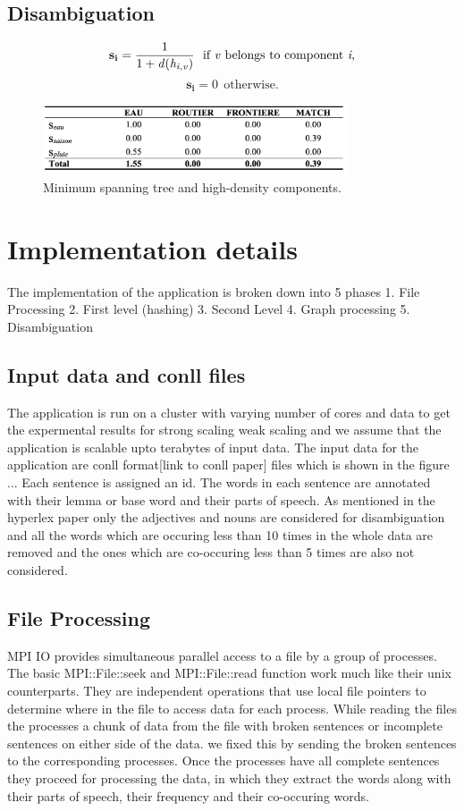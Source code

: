 \documentclass[article,dr=phil,type=drfinal,colorback,accentcolor=tud9c]{tudthesis}
\begin{document}
\subsection{Disambiguation}

\[ \mathbf{s_i} = \frac{1}{1 + \mathit{d}(\mathit{h_{i,v}})} \ \ \textrm{if \textit{v} belongs to component \textit{i},}\] 
\[ \mathbf{s_i} = 0 \ \ \textrm{otherwise.} \]

\begin{figure}[htb]
	\centering
	\includegraphics[width=90mm]{images/wsdscore}
	\caption[Minimum spanning tree and high-density components.]{Minimum spanning tree and high-density components.}
	\label{fig:delineate}
\end{figure}

\newpage
\section{Implementation details}
The implementation of the application is broken down into 5 phases
1. File Processing
2. First level (hashing)
3. Second Level
4. Graph processing
5. Disambiguation
\newpage
\subsection{Input data and conll files}
The application is run on a cluster with varying number of cores and data to get the expermental results for strong scaling weak scaling and we assume that the application is scalable upto terabytes of input data. The input data for the application are conll format[link to conll paper] files which is shown in the figure ... Each sentence is assigned an id. The words in each sentence are annotated with their lemma or base word and their parts of speech.  As mentioned in the hyperlex paper only the adjectives and nouns are considered for disambiguation and all the words which are occuring less than 10 times in the whole data are removed and the ones which are co-occuring less than 5 times are also not considered.

\newpage
\subsection{File Processing}
MPI IO provides simultaneous parallel access to a file by a group of processes.  The basic MPI::File::seek and MPI::File::read function work much like their unix counterparts. They are independent operations that use local file pointers to determine where in the file to access data for each process. While reading the files the processes a chunk of data from the file with broken sentences or incomplete sentences on either side of the data. we fixed this by sending the broken sentences to the corresponding processes. Once the processes have all complete sentences they proceed for processing the data, in which they extract the words along with their parts of speech, their frequency and their co-occuring words.
\end{document}
